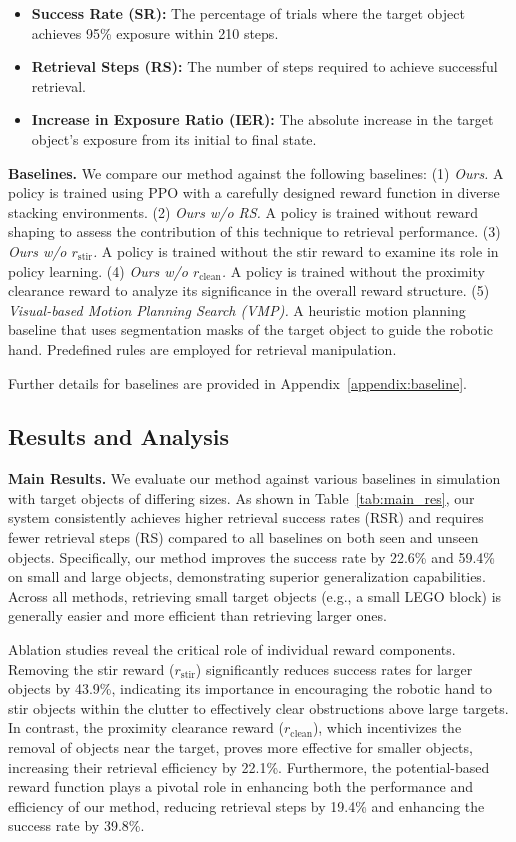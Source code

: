 \documentclass[10pt, a4paper, logo, twocolumn, copyright]{psibot} %
\begin{document}
\begin{itemize} 
    \item \textbf{Success Rate (SR):} The percentage of trials where the target object achieves 95\% exposure within 210 steps.
    \item \textbf{Retrieval Steps (RS):} The number of steps required to achieve successful retrieval. 
    \item \textbf{Increase in Exposure Ratio (IER):} The absolute increase in the target object's exposure from its initial to final state.
\end{itemize}

\noindent \textbf{Baselines.}
We compare our method against the following baselines:
(1) \textit{Ours.} A policy is trained using PPO with a carefully designed reward function in diverse stacking environments. 
(2) \textit{Ours w/o RS.} A policy is trained without reward shaping to assess the contribution of this technique to retrieval performance. 
(3) \textit{Ours w/o $r_\textrm{stir}$.} A policy is trained without the stir reward to examine its role in policy learning.
(4) \textit{Ours w/o $r_\textrm{clean}$.} A policy is trained without the proximity clearance reward to analyze its significance in the overall reward structure.
(5) \textit{Visual-based Motion Planning Search (VMP).} A heuristic motion planning baseline that uses segmentation masks of the target object to guide the robotic hand. Predefined rules are employed for retrieval manipulation.

Further details for baselines are provided in Appendix~\ref{appendix:baseline}.

\subsection{Results and Analysis}
\noindent \textbf{Main Results.}
We evaluate our method against various baselines in simulation with target objects of differing sizes. As shown in Table~\ref{tab:main_res}, our system consistently achieves higher retrieval success rates (RSR) and requires fewer retrieval steps (RS) compared to all baselines on both seen and unseen objects. Specifically, our method improves the success rate by 22.6\% and 59.4\% on small and large objects, demonstrating superior generalization capabilities. Across all methods, retrieving small target objects (e.g., a small LEGO block) is generally easier and more efficient than retrieving larger ones.

Ablation studies reveal the critical role of individual reward components. Removing the stir reward ($r_\textrm{stir}$) significantly reduces success rates for larger objects by 43.9\%, indicating its importance in encouraging the robotic hand to stir objects within the clutter to effectively clear obstructions above large targets. In contrast, the proximity clearance reward ($r_\textrm{clean}$), which incentivizes the removal of objects near the target, proves more effective for smaller objects, increasing their retrieval efficiency by 22.1\%. Furthermore, the potential-based reward function plays a pivotal role in enhancing both the performance and efficiency of our method, reducing retrieval steps by 19.4\% and enhancing the success rate by 39.8\%.
\end{document}
